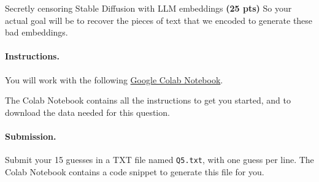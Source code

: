 \begin{question}{
Secretly censoring Stable Diffusion with LLM embeddings \textbf{(25 pts)}}
So your actual goal will be to recover the pieces of text that we encoded to generate these bad embeddings.

\paragraph{Instructions.}
You will work with the following
\href{https://colab.research.google.com/drive/1ZWRRYSLRA7bymQLHvTgIvdnQ1OmdzYIS}{Google Colab Notebook}.

The Colab Notebook contains all the instructions to get you started, and to download the data needed for this question.

\paragraph{Submission.}
Submit your 15 guesses in a TXT file named \texttt{Q5.txt}, with one guess per line. The Colab Notebook contains a code snippet to generate this file for you.

\end{question}